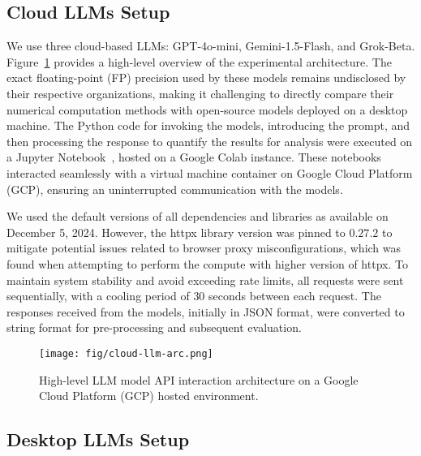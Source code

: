 
\subsection{Cloud LLMs Setup}

We use three cloud-based LLMs: GPT-4o-mini, Gemini-1.5-Flash, and Grok-Beta. 
Figure~\ref{img:cloud-arc} provides a high-level overview of the experimental architecture. 
The exact floating-point (FP) precision used by these models remains undisclosed by their respective organizations, making it challenging to directly compare their numerical computation methods with open-source models deployed on a desktop machine. 
The Python code for invoking the models, introducing the prompt, and then processing the response to quantify the results for analysis were executed on a Jupyter Notebook~\cite{jupyterProjectJupyter}, hosted on a Google Colab instance. 
These notebooks interacted seamlessly with a virtual machine container on Google Cloud Platform (GCP), ensuring an uninterrupted communication with the models.

We used the default versions of all dependencies and libraries as available on December 5, 2024. However, the httpx library version was pinned to $0.27.2$ to mitigate potential issues related to browser proxy misconfigurations, which was found when attempting to perform the compute with higher version of httpx. 
To maintain system stability and avoid exceeding rate limits, all requests were sent sequentially, with a cooling period of $30$ seconds between each request. The responses received from the models, initially in JSON format, were converted to string format for pre-processing and subsequent evaluation.


\begin{figure}[t]
  \centering
  \texttt{[image: fig/cloud-llm-arc.png]}
  \caption{High-level LLM model API interaction architecture on a Google Cloud Platform (GCP) hosted environment.} 
  \label{img:cloud-arc}
\end{figure}



\subsection{Desktop LLMs Setup}

